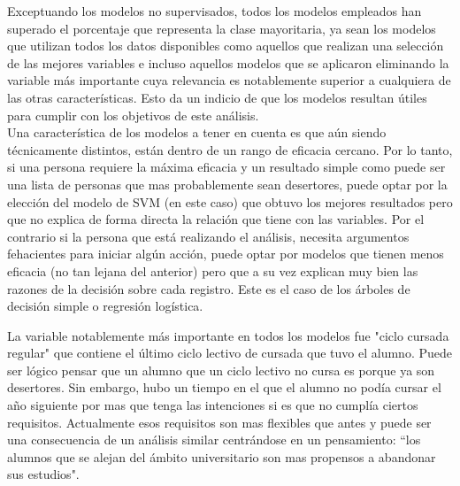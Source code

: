 Exceptuando los modelos no supervisados, todos los modelos empleados han superado el porcentaje que representa la clase mayoritaria, ya sean los modelos que utilizan todos los datos disponibles como aquellos que realizan una selección de las mejores variables e incluso aquellos modelos que se aplicaron eliminando la variable más importante cuya relevancia es notablemente superior a cualquiera de las otras características. Esto da un indicio de que los modelos resultan útiles para cumplir con los objetivos de este análisis.\\

Una característica de los modelos a tener en cuenta es que aún siendo  técnicamente distintos, están dentro de un rango de eficacia cercano. Por lo tanto, si una persona requiere la máxima eficacia y un resultado simple como puede ser una lista de personas que mas probablemente sean desertores, puede optar por la elección del modelo de SVM (en este caso) que obtuvo los mejores resultados pero que no explica de forma directa la relación que tiene con las variables. Por el contrario si la persona que está realizando el análisis, necesita argumentos fehacientes para iniciar algún acción, puede optar por modelos que tienen menos eficacia (no tan lejana del anterior) pero que a su vez explican muy bien las razones de la decisión sobre cada registro. Este es el caso de los árboles de decisión simple o regresión logística.

La variable notablemente más importante en todos los modelos fue "ciclo cursada regular" que contiene el último ciclo lectivo de cursada que tuvo el alumno. Puede ser lógico pensar que un alumno que un ciclo lectivo no cursa es porque ya son desertores. Sin embargo, hubo un tiempo en el que el alumno no podía cursar el año siguiente por mas que tenga las intenciones si es que no cumplía ciertos requisitos. Actualmente esos requisitos son mas flexibles que antes y puede ser una consecuencia de un análisis similar centrándose en un pensamiento: ``los alumnos que se alejan del ámbito universitario son mas propensos a abandonar sus estudios".